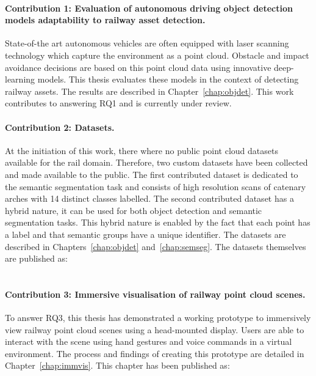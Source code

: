 \paragraph{Contribution 1: Evaluation of autonomous driving object detection models adaptability to railway asset detection.}
State-of-the art autonomous vehicles are often equipped with laser scanning technology which capture the environment as a point cloud. Obstacle and impact avoidance decisions are based on this point cloud data using innovative deep-learning models. This thesis evaluates these models in the context of detecting railway assets. The results are described in Chapter~\ref{chap:objdet}. This work contributes to answering RQ1 and is currently under review.\\

{\footnotesize
\noindent{}
}

\paragraph{Contribution 2: Datasets.}
At the initiation of this work, there where no public point cloud datasets available for the rail domain. Therefore, two custom datasets have been collected and made available to the public. The first contributed dataset is dedicated to the semantic segmentation task and consists of high resolution scans of catenary arches with 14 distinct classes labelled. The second contributed dataset has a hybrid nature, it can be used for both object detection and semantic segmentation tasks. This hybrid nature is enabled by the fact that each point has a label and that semantic groups have a unique identifier. The datasets are described in Chapters~\ref{chap:objdet} and~\ref{chap:semseg}. The datasets themselves are published as:\\

{\footnotesize
\noindent{}\\[1.5\normalbaselineskip]
\noindent{}
}

\paragraph{Contribution 3: Immersive visualisation of railway point cloud scenes.}
To answer RQ3, this thesis has demonstrated a working prototype to immersively view railway point cloud scenes using a head-mounted display. Users are able to interact with the scene using hand gestures and voice commands in a virtual environment. The process and findings of creating this prototype are detailed in Chapter~\ref{chap:immvis}. This chapter has been published as:\\


